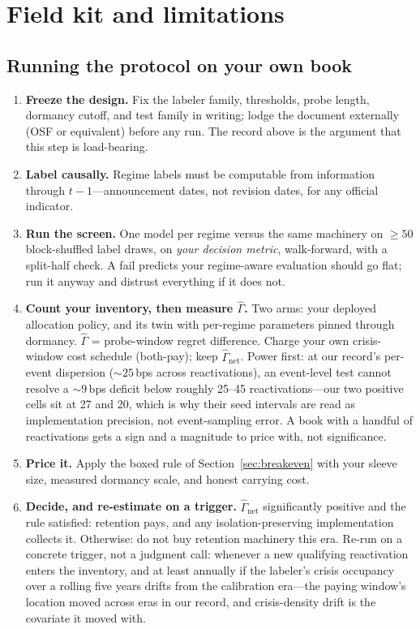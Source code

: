 \documentclass[sigconf,anonymous]{acmart}
\newcommand{\G}{\hat\Gamma}
\begin{document}
\section{Field kit and limitations}
\label{sec:kit}

\subsection{Running the protocol on your own book}

\begin{enumerate}
  \item \textbf{Freeze the design.} Fix the labeler family, thresholds,
  probe length, dormancy cutoff, and test family in writing; lodge the
  document externally (OSF or equivalent) before any run. The record
  above is the argument that this step is load-bearing.
  \item \textbf{Label causally.} Regime labels must be computable from
  information through $t-1$---announcement dates, not revision dates,
  for any official indicator.
  \item \textbf{Run the screen.} One model per regime versus the same
  machinery on $\ge 50$ block-shuffled label draws, on \emph{your
  decision metric}, walk-forward, with a split-half check. A fail
  predicts your regime-aware evaluation should go flat; run it anyway
  and distrust everything if it does not.
  \item \textbf{Count your inventory, then measure $\G$.} Two arms:
  your deployed allocation
  policy, and its twin with per-regime parameters pinned through
  dormancy. $\G$ = probe-window regret difference. Charge your own
  crisis-window cost schedule (both-pay); keep $\G_{\mathrm{net}}$.
  Power first: at our record's per-event dispersion (${\sim}25$\,bps
  across reactivations), an event-level test cannot resolve a
  ${\sim}9$\,bps deficit below roughly 25--45 reactivations---our two
  positive cells sit at 27 and 20, which is why their seed intervals
  are read as implementation precision, not event-sampling error. A
  book with a handful of reactivations gets a sign and a magnitude to
  price with, not significance.
  \item \textbf{Price it.} Apply the boxed rule of
  Section~\ref{sec:breakeven} with your sleeve size, measured dormancy
  scale, and honest carrying cost.
  \item \textbf{Decide, and re-estimate on a trigger.} $\G_{\mathrm{net}}$
  significantly positive and the rule satisfied: retention pays, and
  any isolation-preserving implementation collects it. Otherwise: do
  not buy retention machinery this era. Re-run on a concrete trigger,
  not a judgment call: whenever a new qualifying reactivation enters the
  inventory, and at least annually if the labeler's crisis occupancy
  over a rolling five years drifts from the calibration era---the
  paying window's location moved across eras in our record, and
  crisis-density drift is the covariate it moved with.
\end{enumerate}
\end{document}

